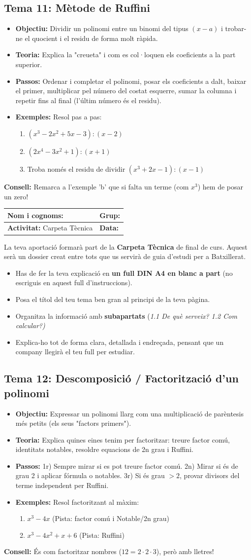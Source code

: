\documentclass[12pt,a4paper]{article}
\newcommand{\introcomuna}{
    \begin{tcolorbox}[colback=gray!5,colframe=gray!50!black,title=\textbf{La Carpeta Tècnica de Matemàtiques}]
    La teva aportació formarà part de la \textbf{Carpeta Tècnica} de final de curs. Aquest serà un dossier creat entre tots que us servirà de guia d'estudi per a Batxillerat.
    
    \begin{itemize}[label=\textbullet, leftmargin=*]
        \item Has de fer la teva explicació en \textbf{un full DIN A4 en blanc a part} (no escriguis en aquest full d'instruccions).
        \item Posa el títol del teu tema ben gran al principi de la teva pàgina.
        \item Organitza la informació amb \textbf{subapartats} (\textit{1.1 De què serveix? 1.2 Com calcular?)}
        \item Explica-ho tot de forma clara, detallada i endreçada, pensant que un company llegirà el teu full per estudiar.
    \end{itemize}
    \end{tcolorbox}
    \vspace{0.1cm}
}
\newcommand{\capcaleraalumne}[1]{
    \begingroup
    \renewcommand{\arraystretch}{2.2}
    \begin{tabularx}{\textwidth}{|X|p{4cm}|}
    \hline
    \textbf{Nom i cognoms:} & \textbf{Grup:} \\ \hline
    \textbf{Activitat:} Carpeta Tècnica & \textbf{Data:} \\ \hline
    \end{tabularx}
    \endgroup
    \vspace{0.4cm}
}
\begin{document}
\subsection*{Tema 11: Mètode de Ruffini}
\begin{itemize}[label=\textbullet]
    \item \textbf{Objectiu:} Dividir un polinomi entre un binomi del tipus $(x-a)$ i trobar-ne el quocient i el residu de forma molt ràpida.
    \item \textbf{Teoria:} Explica la "creueta" i com es col·loquen els coeficients a la part superior.
    \item \textbf{Passos:} Ordenar i completar el polinomi, posar els coeficients a dalt, baixar el primer, multiplicar pel número del costat esquerre, sumar la columna i repetir fins al final (l'últim número és el residu).
    \item \textbf{Exemples:} Resol pas a pas:
    \begin{enumerate}[label=\alph*)]
        \item $(x^3 - 2x^2 + 5x - 3) : (x - 2)$
        \item $(2x^4 - 3x^2 + 1) : (x + 1)$
        \item Troba només el residu de dividir $(x^3 + 2x - 1) : (x - 1)$
    \end{enumerate}
\end{itemize}
\vfill
\noindent\textbf{Consell:} Remarca a l'exemple 'b' que si falta un terme (com $x^3$) hem de posar un zero!

\newpage
\capcaleraalumne{12}
\introcomuna
\subsection*{Tema 12: Descomposició / Factorització d'un polinomi}
\begin{itemize}[label=\textbullet]
    \item \textbf{Objectiu:} Expressar un polinomi llarg com una multiplicació de parèntesis més petits (els seus "factors primers").
    \item \textbf{Teoria:} Explica quines eines tenim per factoritzar: treure factor comú, identitats notables, resoldre equacions de 2n grau i Ruffini.
    \item \textbf{Passos:} 1r) Sempre mirar si es pot treure factor comú. 2n) Mirar si és de grau 2 i aplicar fórmula o notables. 3r) Si és grau $>2$, provar divisors del terme independent per Ruffini.
    \item \textbf{Exemples:} Resol factoritzant al màxim:
    \begin{enumerate}[label=\alph*)]
        \item $x^3 - 4x$ \quad (Pista: factor comú i Notable/2n grau)
        \item $x^3 - 4x^2 + x + 6$ \quad (Pista: Ruffini)
    \end{enumerate}
\end{itemize}
\vfill
\noindent\textbf{Consell:} És com factoritzar nombres ($12 = 2 \cdot 2 \cdot 3$), però amb lletres!
\end{document}
